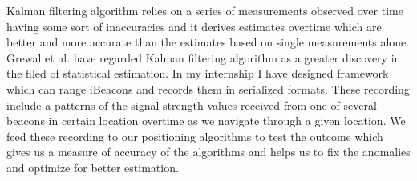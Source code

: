 \par Kalman filtering algorithm relies on a series of measurements observed over time having some sort of inaccuracies and it derives estimates overtime which are better and more accurate than the estimates based on single measurements alone. Grewal et al. \cite{grewal2011kalman} have regarded Kalman filtering algorithm as a greater discovery in the filed of statistical estimation. In my internship I have designed framework which can range iBeacons and records them in serialized formats. These recording include a patterns of the signal strength values received from one of several beacons in certain location overtime as we navigate through a given location. We feed these recording to our positioning algorithms to test the outcome which gives us a measure of accuracy of the algorithms and helps us to fix the anomalies and optimize for better estimation.